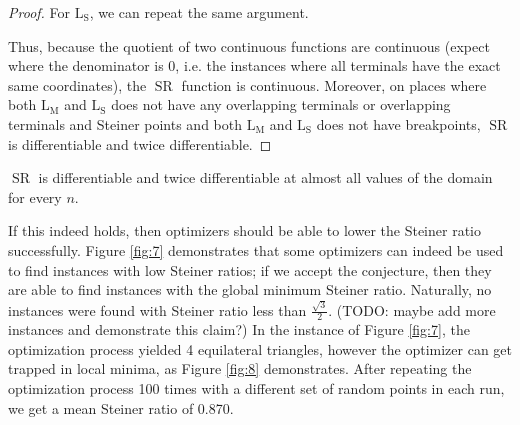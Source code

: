 \documentclass{mpaper}
\begin{document}
\begin{proof}

  For $\operatorname{L_S}$, we can repeat the same argument.


  Thus, because the quotient of two continuous functions are continuous (expect where the denominator is 0, i.e. the instances where all terminals have the exact same coordinates), the $\operatorname{SR}$ function is continuous. Moreover, on places where both $\operatorname{L_M}$ and $\operatorname{L_S}$ does not have any overlapping terminals or overlapping terminals and Steiner points and both $\operatorname{L_M}$ and $\operatorname{L_S}$ does not have breakpoints, $\operatorname{SR}$ is differentiable and twice differentiable.

\end{proof}

\begin{conjecture}
  $\operatorname{SR}$ is differentiable and twice differentiable at almost all values of the domain for every $n$.
\end{conjecture}


If this indeed holds, then optimizers should be able to lower the Steiner ratio successfully. Figure \ref{fig:7} demonstrates that some optimizers can indeed be used to find instances with low Steiner ratios; if we accept the conjecture, then they are able to find instances with the global minimum Steiner ratio. Naturally, no instances were found with Steiner ratio less than $\frac{\sqrt{3}}{2}$. (TODO: maybe add more instances and demonstrate this claim?) In the instance of Figure \ref{fig:7}, the optimization process yielded 4 equilateral triangles, however the optimizer can get trapped in local minima, as Figure \ref{fig:8} demonstrates. After repeating the optimization process 100 times with a different set of random points in each run, we get a mean Steiner ratio of 0.870.
\end{document}
